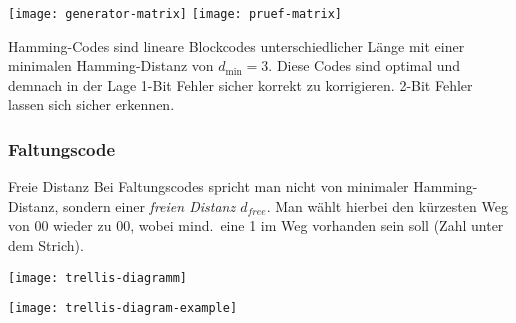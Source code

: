 \begin{center}
    \texttt{[image: generator-matrix]}
    \texttt{[image: pruef-matrix]}
\end{center}

Hamming-Codes sind lineare Blockcodes unterschiedlicher Länge mit einer minimalen Hamming-Distanz von $d_{\min} = 3$.
Diese Codes sind optimal und demnach in der Lage 1-Bit Fehler sicher korrekt zu korrigieren.
2-Bit Fehler lassen sich sicher erkennen.

\subsubsection{Faltungscode}

\begin{definition}{Freie Distanz}
    Bei Faltungscodes spricht man nicht von minimaler Hamming-Distanz, sondern einer \emph{freien Distanz $d_{free}$}.
    Man wählt hierbei den kürzesten Weg von $00$ wieder zu $00$, wobei mind.\ eine 1 im Weg vorhanden sein soll (Zahl unter dem Strich).
\end{definition}

\begin{center}
    \texttt{[image: trellis-diagramm]}
\end{center}

\begin{center}
    \texttt{[image: trellis-diagram-example]}
\end{center}
